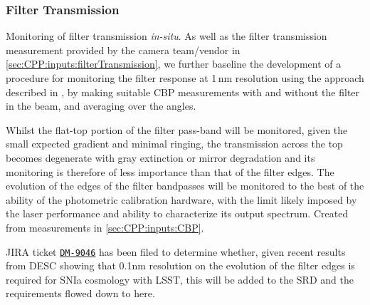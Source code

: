\subsubsection{Filter Transmission}\label{sec:CPP:output:filterTransmission}
Monitoring of filter transmission \emph{in-situ}. As well as the filter transmission measurement provided by the camera team/vendor in \secsymbol\ref{sec:CPP:inputs:filterTransmission}, we further baseline the development of a procedure for monitoring the filter response at 1\,nm resolution using the approach described in \cite{Lupton15}, \ie by making suitable CBP measurements with and without the filter in the beam, and averaging over the angles. 

Whilst the flat-top portion of the filter pass-band will be monitored, given the small expected gradient and minimal ringing, the transmission across the top becomes degenerate with gray extinction or mirror degradation and its monitoring is therefore of less importance than that of the filter edges. The evolution of the edges of the filter bandpasses will be monitored to the best of the ability of the photometric calibration hardware, with the limit likely imposed by the laser performance and ability to characterize its output spectrum.
\alg Created from measurements in \secsymbol\ref{sec:CPP:inputs:CBP}.

\begin{note}
	JIRA ticket \hyperref{https://jira.lsstcorp.org/browse/DM-9046}{}{}{\texttt{DM-9046}} has been filed to determine whether, given recent results from DESC showing that 0.1nm resolution on the evolution of the filter edges is required for SNIa cosmology with LSST, this will be added to the SRD and the requirements flowed down to here.
\end{note}



